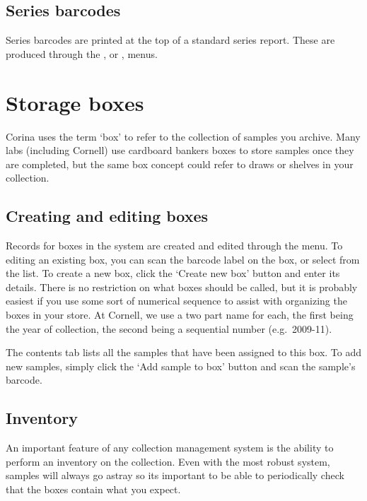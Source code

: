 \subsection{Series barcodes}

Series barcodes are printed at the top of a standard series report.  These are produced through the , or , menus.  


\section{Storage boxes}
\label{txt:assignToBox}
Corina uses the term `box' to refer to the collection of samples you archive.  Many labs (including Cornell) use cardboard bankers boxes to store samples once they are completed, but the same box concept could refer to draws or shelves in your collection.

\subsection{Creating and editing boxes}
Records for boxes in the system are created and edited through the  menu.  To editing an existing box, you can scan the barcode label on the box, or select from the list.  To create a new box, click the `Create new box' button and enter its details.  There is no restriction on what boxes should be called, but it is probably easiest if you use some sort of numerical sequence to assist with organizing the boxes in your store.  At Cornell, we use a two part name for each, the first being the year of collection, the second being a sequential number (e.g.\ 2009-11).

The contents tab lists all the samples that have been assigned to this box.  To add new samples, simply click the `Add sample to box' button and scan the sample's barcode.  

\subsection{Inventory}
An important feature of any collection management system is the ability to perform an inventory on the collection.  Even with the most robust system, samples will always go astray so its important to be able to periodically check that the boxes contain what you expect.

